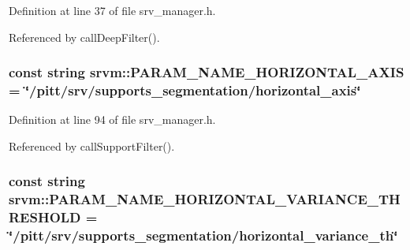 Definition at line 37 of file srv\-\_\-manager.\-h.



Referenced by call\-Deep\-Filter().

\hypertarget{namespacesrvm_a2957bf6ee16944664364c470f1beb958}{
\subsubsection[{P\-A\-R\-A\-M\-\_\-\-N\-A\-M\-E\-\_\-\-H\-O\-R\-I\-Z\-O\-N\-T\-A\-L\-\_\-\-A\-X\-I\-S}]{\setlength{\rightskip}{0pt plus 5cm}const string srvm\-::\-P\-A\-R\-A\-M\-\_\-\-N\-A\-M\-E\-\_\-\-H\-O\-R\-I\-Z\-O\-N\-T\-A\-L\-\_\-\-A\-X\-I\-S = \char`\"{}/pitt/srv/supports\-\_\-segmentation/horizontal\-\_\-axis\char`\"{}}}\label{namespacesrvm_a2957bf6ee16944664364c470f1beb958}


Definition at line 94 of file srv\-\_\-manager.\-h.



Referenced by call\-Support\-Filter().

\hypertarget{namespacesrvm_adb071b5e180a1109af154bd4241a250e}{
\subsubsection[{P\-A\-R\-A\-M\-\_\-\-N\-A\-M\-E\-\_\-\-H\-O\-R\-I\-Z\-O\-N\-T\-A\-L\-\_\-\-V\-A\-R\-I\-A\-N\-C\-E\-\_\-\-T\-H\-R\-E\-S\-H\-O\-L\-D}]{\setlength{\rightskip}{0pt plus 5cm}const string srvm\-::\-P\-A\-R\-A\-M\-\_\-\-N\-A\-M\-E\-\_\-\-H\-O\-R\-I\-Z\-O\-N\-T\-A\-L\-\_\-\-V\-A\-R\-I\-A\-N\-C\-E\-\_\-\-T\-H\-R\-E\-S\-H\-O\-L\-D = \char`\"{}/pitt/srv/supports\-\_\-segmentation/horizontal\-\_\-variance\-\_\-th\char`\"{}}}\label{namespacesrvm_adb071b5e180a1109af154bd4241a250e}


